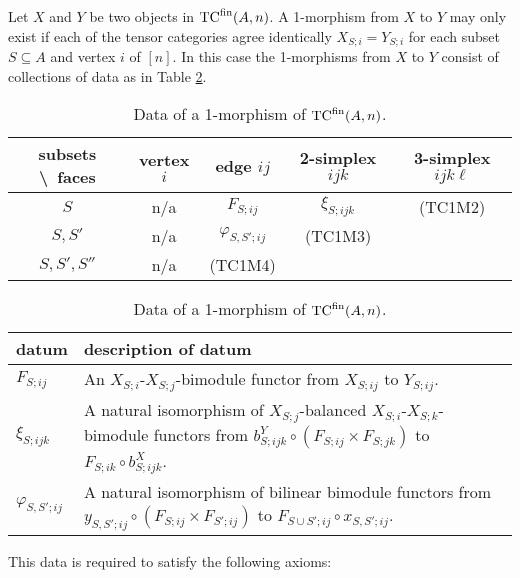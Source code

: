 \documentclass{amsart}
\begin{document}
Let $X$ and $Y$ be two objects in ${\mathrm{TC}^{\text{fin}}}(A,n)$. A 1-morphism from $X$ to $Y$ may only exist if each of the tensor categories agree identically $X_{S;i} = Y_{S;i}$ for each subset $S \subseteq A$ and vertex $i$ of $[n]$. In this case the 1-morphisms from $X$ to $Y$ consist of collections of data as in Table \ref{Table:1MorOfTC}.
\begin{table}[h]
	\caption{Data of a 1-morphism of ${\mathrm{TC}^{\text{fin}}}(A,n)$.}
	\begin{tabular}{c |cccc}
	 subsets \textbackslash\ faces & vertex $i$ & edge $ij$ & 2-simplex $ijk$ & 3-simplex $ijk\ell$  \\
	\hline
	$S$ 				& n/a & $F_{S; ij}$ & $\xi_{S; ijk}$  &  (TC1M2) \\
	$S, S'$ 			& n/a & $\varphi_{S, S';ij}$ &  (TC1M3) & \\
	$S, S', S''$ 		& n/a  & (TC1M4) & & \\
	\end{tabular}
	
	\vspace{0.5cm}
	
	\begin{tabular}{l p{11cm}}
		datum & description of datum \\ \hline
		$F_{S;ij}$ & An $X_{S;i}$-$X_{S;j}$-bimodule functor from $X_{S;ij}$ to $Y_{S;ij}$. \\
		$\xi_{S;ijk}$ & A natural isomorphism of $X_{S;j}$-balanced $X_{S;i}$-$X_{S;k}$-bimodule functors from $b^Y_{S;ijk} \circ (F_{S;ij} \times F_{S; jk})$ to $F_{S;ik} \circ b^X_{S;ijk}$. \\
		$\varphi_{S,S'; ij}$ & A natural isomorphism of bilinear bimodule functors from $y_{S,S'; ij} \circ (F_{S; ij} \times F_{S';ij})$ to $F_{S \cup S'; ij} \circ x_{S, S'; ij}$. 
	\end{tabular}
	\label{Table:1MorOfTC}
\end{table}
This data is required to satisfy the following axioms:
\end{document}
